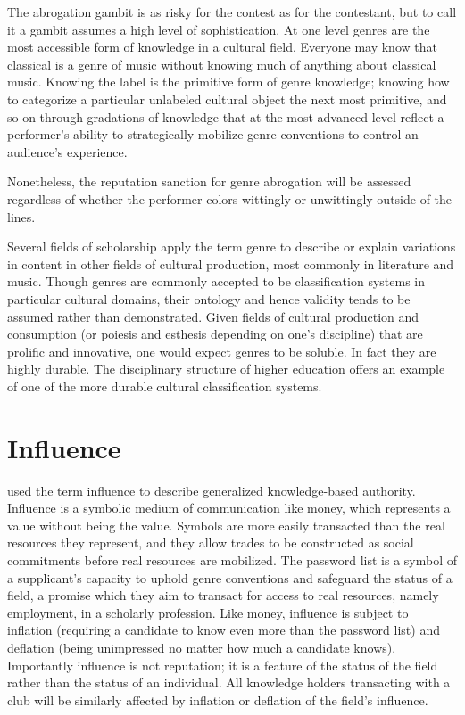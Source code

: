 \documentclass[]{book}
\theoremstyle{definition}
\theoremstyle{definition}
\theoremstyle{definition}
\theoremstyle{remark}
\begin{document}
The abrogation gambit is as risky for the contest as for the contestant,
but to call it a gambit assumes a high level of sophistication. At one
level genres are the most accessible form of knowledge in a cultural
field. Everyone may know that classical is a genre of music without
knowing much of anything about classical music. Knowing the label is the
primitive form of genre knowledge; knowing how to categorize a
particular unlabeled cultural object the next most primitive, and so on
through gradations of knowledge that at the most advanced level reflect
a performer's ability to strategically mobilize genre conventions to
control an audience's experience.

Nonetheless, the reputation sanction for genre abrogation will be
assessed regardless of whether the performer colors wittingly or
unwittingly outside of the lines.

Several fields of scholarship apply the term genre to describe or
explain variations in content in other fields of cultural production,
most commonly in literature and music. Though genres are commonly
accepted to be classification systems in particular cultural domains,
their ontology and hence validity tends to be assumed rather than
demonstrated. Given fields of cultural production and consumption (or
poiesis and esthesis depending on one's discipline) that are prolific
and innovative, one would expect genres to be soluble. In fact they are
highly durable. The disciplinary structure of higher education offers an
example of one of the more durable cultural classification systems.

\hypertarget{influence}{%
\section{Influence}\label{influence}}

\citet{Parsons1963Concept} used the term influence to describe
generalized knowledge-based authority. Influence is a symbolic medium of
communication like money, which represents a value without being the
value. Symbols are more easily transacted than the real resources they
represent, and they allow trades to be constructed as social commitments
before real resources are mobilized. The password list is a symbol of a
supplicant's capacity to uphold genre conventions and safeguard the
status of a field, a promise which they aim to transact for access to
real resources, namely employment, in a scholarly profession. Like
money, influence is subject to inflation (requiring a candidate to know
even more than the password list) and deflation (being unimpressed no
matter how much a candidate knows). Importantly influence is not
reputation; it is a feature of the status of the field rather than the
status of an individual. All knowledge holders transacting with a club
will be similarly affected by inflation or deflation of the field's
influence.
\end{document}
